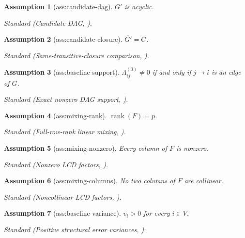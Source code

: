 \documentclass{article}
\newtheorem{assumption}{Assumption}
\begin{document}
\begin{assumption}[ass:candidate-dag]\label{ass:candidate-dag}
\(G'\) is acyclic.
\par\smallskip\noindent\emph{Standard} (Candidate DAG, \cite{LeyesCarrenoMeroniSeigal2025}).
\end{assumption}

\begin{assumption}[ass:candidate-closure]\label{ass:candidate-closure}
\(\overline{G'}=\overline G\).
\par\smallskip\noindent\emph{Standard} (Same-transitive-closure comparison, \cite{LeyesCarrenoMeroniSeigal2025}).
\end{assumption}

\begin{assumption}[ass:baseline-support]\label{ass:baseline-support}
\(\Lambda^{(0)}_{ij}\ne0\) if and only if \(j\to i\) is an edge of \(G\).
\par\smallskip\noindent\emph{Standard} (Exact nonzero DAG support, \cite{LeyesCarrenoMeroniSeigal2025}).
\end{assumption}

\begin{assumption}[ass:mixing-rank]\label{ass:mixing-rank}
\(\operatorname{rank}(F)=p\).
\par\smallskip\noindent\emph{Standard} (Full-row-rank linear mixing, \cite{LeyesCarrenoMeroniSeigal2025}).
\end{assumption}

\begin{assumption}[ass:mixing-nonzero]\label{ass:mixing-nonzero}
Every column of \(F\) is nonzero.
\par\smallskip\noindent\emph{Standard} (Nonzero LCD factors, \cite{LeyesCarrenoMeroniSeigal2025}).
\end{assumption}

\begin{assumption}[ass:mixing-columns]\label{ass:mixing-columns}
No two columns of \(F\) are collinear.
\par\smallskip\noindent\emph{Standard} (Noncollinear LCD factors, \cite{LeyesCarrenoMeroniSeigal2025}).
\end{assumption}

\begin{assumption}[ass:baseline-variance]\label{ass:baseline-variance}
\(v_i>0\) for every \(i\in V\).
\par\smallskip\noindent\emph{Standard} (Positive structural error variances, \cite{SquiresSeigalBhateUhler2023}).
\end{assumption}
\end{document}
